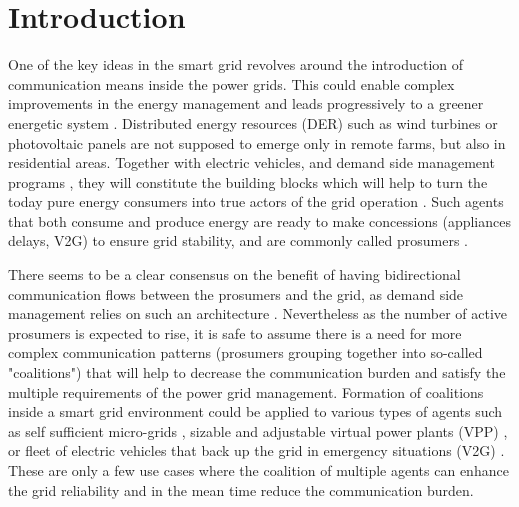 \documentclass[conference]{IEEEtran}
\begin{document}
\section{Introduction}
\label{sec:introduction}

One of the key ideas in the smart grid revolves around the introduction of communication means inside the power grids. This could enable complex improvements in the energy management and leads progressively to a greener energetic system \cite{Ramchurn} \cite{WuHamedHuangBook2011}. Distributed energy resources (DER) such as wind turbines or photovoltaic panels are not supposed to emerge only in remote farms, but also in residential areas. Together with electric vehicles, and demand side management programs \cite{Samadi2014}, they will constitute the building blocks which will help to turn the today pure energy consumers into true actors of the grid operation \cite{Ramchurn}. Such agents that both consume and produce energy are ready to make concessions (appliances delays, V2G) to ensure grid stability, and are commonly called prosumers \cite{6883384,Ramchurn}.

There seems to be a clear consensus on the benefit of having bidirectional communication flows between the prosumers and the grid, as demand side management relies on such an architecture \cite{WuHamedHuangBook2011}. Nevertheless as the number of active prosumers is expected to rise, it is safe to assume there is a need for more complex communication patterns (prosumers grouping together into so-called "coalitions") that will help to decrease the communication burden and satisfy the multiple requirements of the power grid management. Formation of coalitions inside a smart grid environment could be applied to various types of agents such as self sufficient micro-grids \cite{Pahwa}, sizable and adjustable virtual power plants (VPP) \cite{Braun, Ramchurn}, or fleet of electric vehicles that back up the grid in emergency situations (V2G) \cite{Ramchurn}. These are only a few use cases where the coalition of multiple agents can enhance the grid reliability and in the mean time reduce the communication burden.
\end{document}
